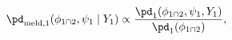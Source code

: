 \begin{equation}
  \pd_{\text{meld}, 1} (\phi_{1 \cap 2}, \psi_{1} \mid Y_{1}) \propto
  \frac {
    \pd_{1}(\phi_{1 \cap 2}, \psi_{1}, Y_{1})
  } {
    \pd_{1}(\phi_{1 \cap 2})
  },
  \label{eqn:stage-one-target}
\end{equation}